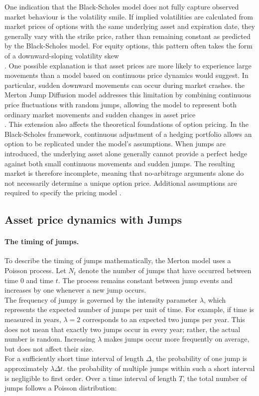\documentclass{article}
\begin{document}
	One indication that the Black-Scholes model does not fully capture observed market behaviour is the volatility smile. If implied volatilities are calculated from market prices of options with the same underlying asset and expiration date, they generally vary with the strike price, rather than remaining constant as predicted by the Black-Scholes model. For equity options, this pattern often takes the form of a downward-sloping volatility skew \cite{joshi}\\.
	One possible explanation is that asset prices are more likely to experience large movements than a model based on continuous price dynamics would suggest. In particular, sudden downward movements can occur during market crashes. the Merton Jump Diffusion model addresses this limitation by combining continuous price fluctuations with random jumps, allowing the model to represent both ordinary market movements and sudden changes in asset price \cite{joshi}\\.
	This extension also affects the theoretical foundations of option pricing. In the Black-Scholes framework, continuous adjustment of a hedging portfolio allows an option to be replicated under the model's assumptions. When jumps are introduced, the underlying asset alone generally cannot provide a perfect hedge against both small continuous movements and sudden jumps. The resulting market is therefore incomplete, meaning that no-arbitrage arguments alone do not necessarily determine a unique option price. Additional assumptions are required to specify the pricing model \cite{joshi}.
	
	\subsection{Asset price dynamics with Jumps}
	
	\paragraph{The timing of jumps.}
	
	To describe the timing of jumps mathematically, the Merton model uses a Poisson process. Let $N_t$ denote the number of jumps that have occurred between time $0$ and time $t$. The process remains constant between jump events and increases by one whenever a new jump occurs.\\
	The frequency of jumpy is governed by the intensity parameter $\lambda$, which represents the expected number of jumps per unit of time. For example, if time is measured in years, $\lambda = 2$ corresponds to an expected two jumps per year. This does not mean that exactly two jumps occur in every year; rather, the actual number is random. Increasing $\lambda$ makes jumps occur more frequently on average, but does not affect their size. \\
	For a sufficiently short time interval of length $\Delta$, the probability of one jump is approximately $\lambda\Delta t$. the probability of multiple jumps within such a short interval is negligible to first order. Over a time interval of length $T$, the total number of jumps follows a Poisson distribution:
	
\end{document}

